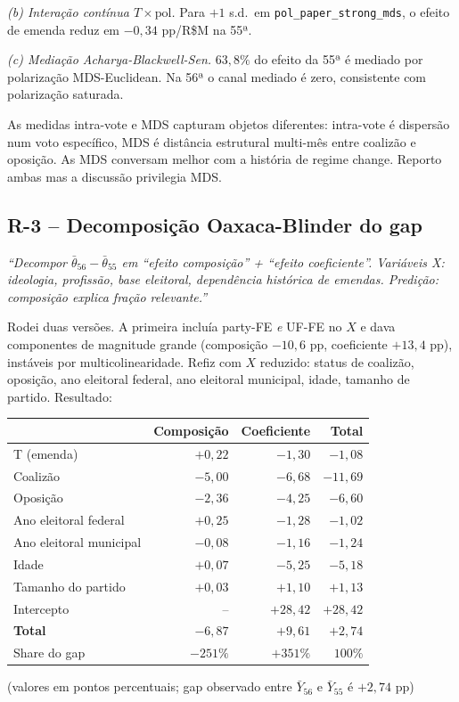 \documentclass[11pt,a4paper]{article}
\newcommand{\pedido}[1]{\par\medskip\noindent\textit{\textcolor{quotegray}{#1}}\par\smallskip}
\begin{document}
\textit{(b) Interação contínua $T \times \mathrm{pol}$.} Para $+1$ s.d.\ em \texttt{pol\_paper\_strong\_mds}, o efeito de emenda reduz em $-0{,}34$ pp/R\$M na 55ª.

\textit{(c) Mediação Acharya-Blackwell-Sen.} $63{,}8\%$ do efeito da 55ª é mediado por polarização MDS-Euclidean. Na 56ª o canal mediado é zero, consistente com polarização saturada.

As medidas intra-vote e MDS capturam objetos diferentes: intra-vote é dispersão num voto específico, MDS é distância estrutural multi-mês entre coalizão e oposição. As MDS conversam melhor com a história de regime change. Reporto ambas mas a discussão privilegia MDS.

\subsection*{R-3 -- Decomposição Oaxaca-Blinder do gap}

\pedido{``Decompor $\bar\theta_{56} - \bar\theta_{55}$ em ``efeito composição'' + ``efeito coeficiente''. Variáveis X: ideologia, profissão, base eleitoral, dependência histórica de emendas. Predição: composição explica fração relevante.''}

Rodei duas versões. A primeira incluía party-FE \emph{e} UF-FE no $X$ e dava componentes de magnitude grande (composição $-10{,}6$ pp, coeficiente $+13{,}4$ pp), instáveis por multicolinearidade. Refiz com $X$ reduzido: status de coalizão, oposição, ano eleitoral federal, ano eleitoral municipal, idade, tamanho de partido. Resultado:

\begin{center}
\small
\begin{tabular}{lrrr}
\toprule
& Composição & Coeficiente & Total \\
\midrule
T (emenda)            & $+0{,}22$ & $-1{,}30$ & $-1{,}08$ \\
Coalizão              & $-5{,}00$ & $-6{,}68$ & $-11{,}69$ \\
Oposição              & $-2{,}36$ & $-4{,}25$ & $-6{,}60$ \\
Ano eleitoral federal & $+0{,}25$ & $-1{,}28$ & $-1{,}02$ \\
Ano eleitoral municipal & $-0{,}08$ & $-1{,}16$ & $-1{,}24$ \\
Idade                 & $+0{,}07$ & $-5{,}25$ & $-5{,}18$ \\
Tamanho do partido    & $+0{,}03$ & $+1{,}10$ & $+1{,}13$ \\
Intercepto            & --        & $+28{,}42$ & $+28{,}42$ \\
\midrule
\textbf{Total} & \textbf{$-6{,}87$} & \textbf{$+9{,}61$} & \textbf{$+2{,}74$} \\
\midrule
Share do gap & $-251\%$ & $+351\%$ & $100\%$ \\
\bottomrule
\end{tabular}
\end{center}
(valores em pontos percentuais; gap observado entre $\bar{Y}_{56}$ e $\bar{Y}_{55}$ é $+2{,}74$ pp)
\end{document}
